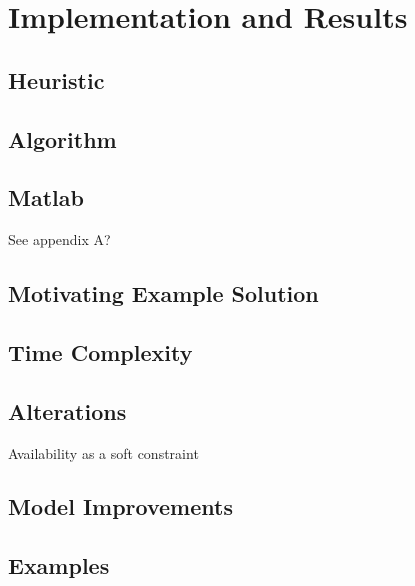 \chapter{Implementation and Results}

\section{Heuristic}

\section{Algorithm}

\section{Matlab}

See appendix A?

\section{Motivating Example Solution}

\section{Time Complexity}

\section{Alterations}
Availability as a soft constraint
\section{Model Improvements}

\section{Examples}


